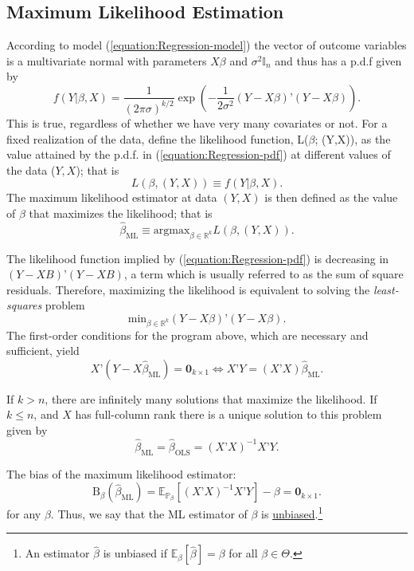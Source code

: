 \documentclass[11pt]{article} %
\begin{document}
\subsection{Maximum Likelihood Estimation}

According to model (\ref{equation:Regression-model}) the vector of outcome variables is a multivariate normal with parameters $X\beta$ and $\sigma^2 \mathbb{I}_n$ and thus has a p.d.f given by
\begin{equation}\label{equation:Regression-pdf}
f( Y | \beta , X ) = \frac{1}{(2 \pi \sigma)^{k/2}} \exp \left( -\frac{1}{2 \sigma^2} (Y - X \beta)’ (Y-X\beta) \right).  
\end{equation}
This is true, regardless of whether we have very many covariates or not. For a fixed realization of the data, define the likelihood function, L($\beta$; (Y,X)), as the value attained by the p.d.f. in (\ref{equation:Regression-pdf}) at different values of the data ($Y, X$); that is 
\[ L(\beta, (Y,X)) \equiv f(Y | \beta, X ). \]
The maximum likelihood estimator at data $(Y,X)$ is then defined as the value of $\beta$ that maximizes the likelihood; that is
\[ \widehat{\beta}_{\textrm{ML}} \equiv \textrm{argmax}_{\beta \in \mathbb{R}^{k}} L(\beta, (Y,X)).   \]

\noindent The likelihood function implied by (\ref{equation:Regression-pdf}) is decreasing in $(Y-XB)’(Y-XB)$, a term which is usually referred to as the sum of square residuals. Therefore, maximizing the likelihood is equivalent to solving the \emph{least-squares} problem
\[ \textrm{min}_{\beta \in \mathbb{R}^{k}} (Y-X\beta)’(Y-X\beta).   \]
The first-order conditions for the program above, which are necessary and sufficient, yield
\[ X’(Y-X\widehat{\beta}_{\textrm{ML}}) = \textbf{0}_{k \times 1} \iff X’Y = (X’X) \widehat{\beta}_{\textrm{ML}}. \]

\noindent If $k > n$, there are infinitely many solutions that maximize the likelihood.  If $k \leq n$, and $X$ has full-column rank there is a unique solution to this problem given by
\begin{equation} \label{equation:OLS}
\widehat{\beta}_{\textrm{ML}} = \widehat{\beta}_{\textrm{OLS}} = (X’X)^{-1} X’Y.
\end{equation}

\noindent The bias of the maximum likelihood estimator:
\begin{equation} \label{equation:bias}
\textrm{B}_{\beta}(\widehat{\beta}_{\textrm{ML}}) = \mathbb{E}_{\mathbb{P}_{\beta}} [ (X’X)^{-1} X’Y ] - \beta = \mathbf{0}_{k \times 1}.
\end{equation}
for any $\beta$. Thus, we say that the ML estimator of $\beta$ is \underline{unbiased}.\footnote{An estimator $\widehat{\beta}$ is unbiased if $\mathbb{E}_{\beta} [\widehat{\beta}] = \beta$ for all $\beta \in \Theta$.} 
\end{document}
